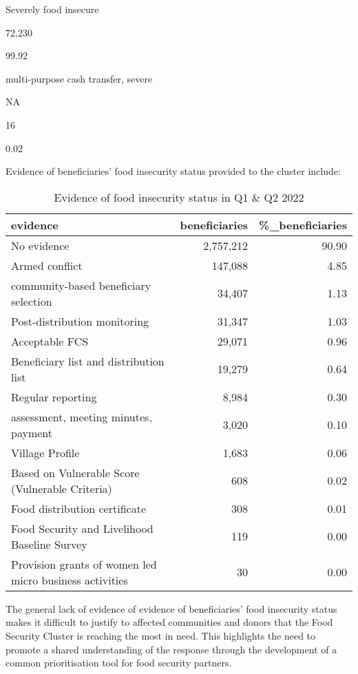 \documentclass[
]{article}
\begin{document}
Severely food insecure

72,230

99.92

multi-purpose cash transfer, severe

NA

16

0.02

Evidence of beneficiaries' food insecurity status provided to the
cluster include:

\begin{table}

\caption{\label{tab:table-fs-evidence}Evidence of food insecurity status in Q1 & Q2 2022}
\centering
\begin{tabular}[t]{l|r|r}
\hline
evidence & beneficiaries & \%\_beneficiaries\\
\hline
No evidence & 2,757,212 & 90.90\\
\hline
Armed conflict & 147,088 & 4.85\\
\hline
community-based beneficiary selection & 34,407 & 1.13\\
\hline
Post-distribution monitoring & 31,347 & 1.03\\
\hline
Acceptable FCS & 29,071 & 0.96\\
\hline
Beneficiary list and distribution list & 19,279 & 0.64\\
\hline
Regular reporting & 8,984 & 0.30\\
\hline
assessment, meeting minutes, payment & 3,020 & 0.10\\
\hline
Village Profile & 1,683 & 0.06\\
\hline
Based on Vulnerable Score (Vulnerable Criteria) & 608 & 0.02\\
\hline
Food distribution certificate & 308 & 0.01\\
\hline
Food Security and Livelihood Baseline Survey & 119 & 0.00\\
\hline
Provision grants of women led micro business activities & 30 & 0.00\\
\hline
\end{tabular}
\end{table}

The general lack of evidence of evidence of beneficiaries' food
insecurity status makes it difficult to justify to affected communities
and donors that the Food Security Cluster is reaching the most in need.
This highlights the need to promote a shared understanding of the
response through the development of a common prioritisation tool for
food security partners.
\end{document}
